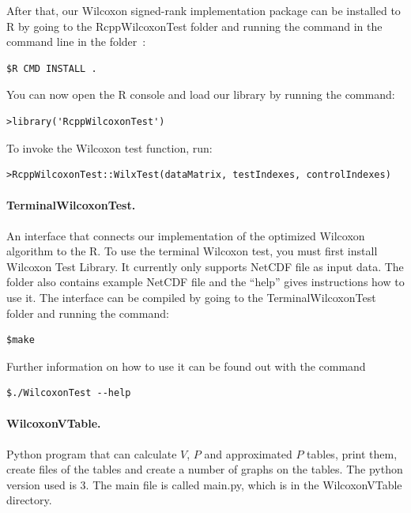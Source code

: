 \documentclass[12pt]{article}
\begin{document}
{After that, our Wilcoxon signed-rank implementation package can be installed to R by going to the RcppWilcoxonTest folder and running the command in the command line in the folder~\cite{writing_r_extensions}:

\begin{lstlisting}
$R CMD INSTALL .
\end{lstlisting}

You can now open the R console and load our library by running the command:

\begin{lstlisting}
>library('RcppWilcoxonTest')
\end{lstlisting}

To invoke the Wilcoxon test function, run:

\begin{lstlisting}
>RcppWilcoxonTest::WilxTest(dataMatrix, testIndexes, controlIndexes)
\end{lstlisting}

\paragraph{TerminalWilcoxonTest.}

An interface that connects our implementation of the optimized Wilcoxon algorithm to the R. To use the terminal Wilcoxon test, you must first install Wilcoxon Test Library. It currently only supports NetCDF file as input data. The folder also contains example NetCDF file and the ``help'' gives instructions how to use it. The interface can be compiled by going to the TerminalWilcoxonTest folder and running the command:
\begin{lstlisting}
$make
\end{lstlisting}

Further information on how to use it can be found out with the command
\begin{lstlisting}
$./WilcoxonTest --help
\end{lstlisting}

\paragraph{WilcoxonVTable.}
Python program that can calculate $V$, $P$ and approximated $P$ tables, print them, create files of the tables and create a number of graphs on the tables. The python version used is 3. The main file is called main.py, which is in the WilcoxonVTable directory.
\newpage
}
\end{document}
